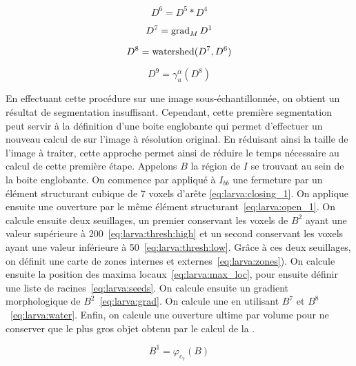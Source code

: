 \documentclass[\main/main.tex]{subfiles}
\begin{document}
\begin{equation}
    \label{eq:larva:down:seeds}
    D^{6}= D^{5} * D^{4}
\end{equation}

\begin{equation}
    \label{eq:larva:down:grad}
    D^{7}= \operatorname{\textnormal{grad}}_M{D^1}
\end{equation}

\begin{equation}
    \label{eq:larva:down:water}
    D^{8}= \operatorname{\textnormal{watershed}}(D^{7},D^{6})
\end{equation}

\begin{equation}
    \label{eq:larva:down:water}
    D^{9}= \gamma^{\alpha}_{u}(D^8)
\end{equation}

En effectuant cette procédure sur une image sous-échantillonnée, on obtient un résultat de segmentation insuffisant.
%
Cependant, cette première segmentation peut servir à la définition d'une boite englobante qui permet d'effectuer un nouveau calcul de \watershed{} sur l'image à résolution original.
%
En réduisant ainsi la taille de l'image à traiter, cette approche permet ainsi de réduire le temps nécessaire au calcul de cette première étape.
%
Appelons $B$ la région de $I$ se trouvant au sein de la boite englobante.
%
On commence par appliqué à $I_{bb}$ une fermeture par un élément structurant cubique de 7 voxels d'arête \eqref{eq:larva:closing_1}.
%
On applique ensuite une ouverture par le même élément structurant~\eqref{eq:larva:open_1}.
%
On calcule ensuite deux seuillages, un premier conservant les voxels de $B^2$ ayant une valeur supérieure à 200~\eqref{eq:larva:thresh:high} et un second conservant les voxels ayant une valeur inférieure à 50~\eqref{eq:larva:thresh:low}.
%
Grâce à ces deux seuillages, on définit une carte de zones internes et externes~\eqref{eq:larva:zones}).
%
On calcule ensuite la position des maxima locaux~\eqref{eq:larva:max_loc}, pour ensuite définir une liste de racines~\eqref{eq:larva:seeds}.
%
On calcule ensuite un gradient morphologique de $B^2$~\eqref{eq:larva:grad}.
%
On calcule une \watershed{} en utilisant $B^7$ et $B^8$~\eqref{eq:larva:water}.
%
Enfin, on calcule une ouverture ultime par volume pour ne conserver que le plus gros objet obtenu par le calcul de la \lpe{}.

\begin{equation}
    \label{eq:larva:closing_1}
    B^1= \varphi_{c_7}(B)
\end{equation}
\end{document}
